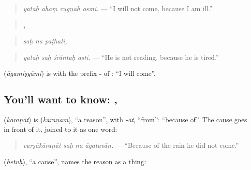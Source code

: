 \begin{quote}
\textbf{   }
\end{quote}

\begin{quote}
\emph{yataḥ ahaṃ rugṇaḥ asmi.} — \textquotedblleft{}I will not come, because I am ill.\textquotedblright{}
\end{quote}

\begin{quote}
\textbf{  ,}
\end{quote}

\begin{quote}
\emph{saḥ na paṭhati,}
\end{quote}

\begin{quote}
\textbf{   }
\end{quote}

\begin{quote}
\emph{yataḥ saḥ śrāntaḥ asti.} — \textquotedblleft{}He is not reading, because he is tired.\textquotedblright{}
\end{quote}

\textbf{} (\emph{āgamiṣyāmi}) is \textbf{} with the prefix \textbf{-} of \textbf{}: \textquotedblleft{}I will come\textquotedblright{}.

\subsection*{You'll want to know: , }
\textbf{} (\emph{kāraṇāt}) is \textbf{} (\emph{kāraṇam}), \textquotedblleft{}a reason\textquotedblright{}, with \emph{-āt}, \textquotedblleft{}from\textquotedblright{}: \textquotedblleft{}because of\textquotedblright{}. The cause goes in front of it, joined to it as one word:

\begin{quote}
\textbf{   }
\end{quote}

\begin{quote}
\emph{varṣākāraṇāt saḥ na āgatavān.} — \textquotedblleft{}Because of the rain he did not come.\textquotedblright{}
\end{quote}

\textbf{} (\emph{hetuḥ}), \textquotedblleft{}a cause\textquotedblright{}, names the reason as a thing:

